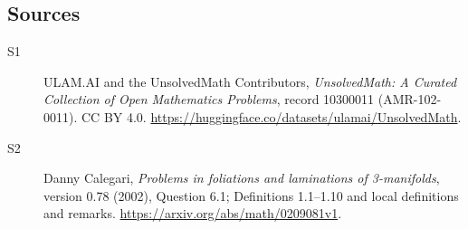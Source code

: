 \documentclass[11pt]{article}
\begin{document}
\subsection{Sources}
\begin{description}
\item[\hypertarget{source:10300011:1}{S1}] ULAM.AI and the UnsolvedMath Contributors, \emph{UnsolvedMath: A Curated Collection of Open Mathematics Problems}, record 10300011 (AMR-102-0011). CC BY 4.0. \url{https://huggingface.co/datasets/ulamai/UnsolvedMath}.
\item[\hypertarget{source:10300011:2}{S2}] Danny Calegari, \emph{Problems in foliations and laminations of 3-manifolds}, version 0.78 (2002), Question 6.1; Definitions 1.1--1.10 and local definitions and remarks. \url{https://arxiv.org/abs/math/0209081v1}.
\end{description}
\label{end:10300011}
\end{document}
